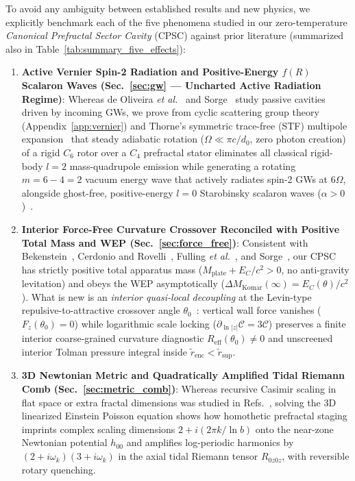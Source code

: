 \documentclass[aps,prd,twocolumn,10pt,showkeys,nofootinbib,floatfix,longbibliography]{revtex4-2}
\begin{document}
To avoid any ambiguity between established results and new physics, we explicitly benchmark each of the five phenomena studied in our zero-temperature \emph{Canonical Prefractal Sector Cavity} (CPSC) against prior literature (summarized also in Table~\ref{tab:summary_five_effects}):
\begin{enumerate}
    \item \textbf{Active Vernier Spin-2 Radiation and Positive-Energy $f(R)$ Scalaron Waves (Sec.~\ref{sec:gw} --- Uncharted Active Radiation Regime)}: Whereas de Oliveira \emph{et al.}~\cite{deoliveira2026entropy} and Sorge~\cite{sorge2023memory} study passive cavities driven by incoming GWs, we prove from cyclic scattering group theory (Appendix~\ref{app:vernier}) and Thorne's symmetric trace-free (STF) multipole expansion~\cite{thorne1980rmp} that steady adiabatic rotation ($\Omega \ll \pi c/d_0$, zero photon creation) of a rigid $C_6$ rotor over a $C_4$ prefractal stator eliminates all classical rigid-body $l=2$ mass-quadrupole emission while generating a rotating $m = 6-4 = 2$ vacuum energy wave that actively radiates spin-2 GWs at $6\Omega$, alongside ghost-free, positive-energy $l=0$ Starobinsky scalaron waves ($\alpha > 0$)~\cite{berry2011}.
    \item \textbf{Interior Force-Free Curvature Crossover Reconciled with Positive Total Mass and WEP (Sec.~\ref{sec:force_free})}: Consistent with Bekenstein~\cite{bekenstein2013prd}, Cerdonio and Rovelli~\cite{cerdonio2015ijmpd}, Fulling \emph{et al.}~\cite{fulling2007}, and Sorge~\cite{sorge2021buoyancy}, our CPSC has strictly positive total apparatus mass ($M_{\mathrm{plate}} + E_C/c^2 > 0$, no anti-gravity levitation) and obeys the WEP asymptotically ($\Delta M_{\mathrm{Komar}}(\infty) = E_C(\theta)/c^2$). What is new is an \emph{interior quasi-local decoupling} at the Levin-type repulsive-to-attractive crossover angle $\theta_0$~\cite{levin2010}: vertical wall force vanishes ($F_z(\theta_0)=0$) while logarithmic scale locking ($\partial_{\ln|z|}\mathcal{C} = 3\mathcal{C}$) preserves a finite interior coarse-grained curvature diagnostic $R_{\mathrm{eff}}(\theta_0) \neq 0$ and unscreened interior Tolman pressure integral inside $\tilde{r}_{\mathrm{enc}} < \tilde{r}_{\mathrm{sup}}$.
    \item \textbf{3D Newtonian Metric and Quadratically Amplified Tidal Riemann Comb (Sec.~\ref{sec:metric_comb})}: Whereas recursive Casimir scaling in flat space or extra fractal dimensions was studied in Refs.~\cite{cheng2013ijtp,shajesh2016,shajesh2017,gordon2026prd}, solving the 3D linearized Einstein Poisson equation shows how homothetic prefractal staging imprints complex scaling dimensions $2 + i(2\pi k/\ln b)$ onto the near-zone Newtonian potential $h_{00}$ and amplifies log-periodic harmonics by $(2 + i\omega_k)(3 + i\omega_k)$ in the axial tidal Riemann tensor $R_{0z0z}$, with reversible rotary quenching.

\end{enumerate}
\end{document}
